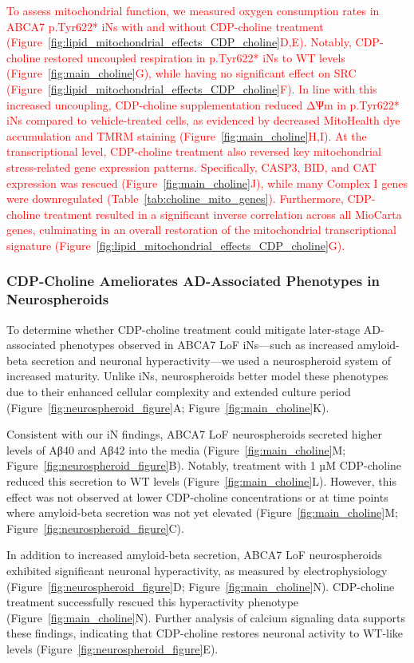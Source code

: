 \textcolor{red}{To assess mitochondrial function, we measured oxygen consumption rates in ABCA7 p.Tyr622* iNs with and without CDP-choline treatment (Figure~\ref{fig:lipid_mitochondrial_effects_CDP_choline}D,E). Notably, CDP-choline restored uncoupled respiration in p.Tyr622* iNs to WT levels (Figure~\ref{fig:main_choline}G), while having no significant effect on SRC (Figure~\ref{fig:lipid_mitochondrial_effects_CDP_choline}F). In line with this increased uncoupling, CDP-choline supplementation reduced ΔѰm in p.Tyr622* iNs compared to vehicle-treated cells, as evidenced by decreased MitoHealth dye accumulation and TMRM staining (Figure~\ref{fig:main_choline}H,I). At the transcriptional level, CDP-choline treatment also reversed key mitochondrial stress-related gene expression patterns. Specifically, CASP3, BID, and CAT expression was rescued (Figure~\ref{fig:main_choline}J), while many Complex I genes were downregulated (Table~\ref{tab:choline_mito_genes}). Furthermore, CDP-choline treatment resulted in a significant inverse correlation across all MioCarta genes, culminating in an overall restoration of the mitochondrial transcriptional signature (Figure~\ref{fig:lipid_mitochondrial_effects_CDP_choline}G).}

\subsubsection{CDP-Choline Ameliorates AD-Associated Phenotypes in Neurospheroids}
To determine whether CDP-choline treatment could mitigate later-stage AD-associated phenotypes observed in ABCA7 LoF iNs—such as increased amyloid-beta secretion and neuronal hyperactivity—we used a neurospheroid system of increased maturity. Unlike iNs, neurospheroids better model these phenotypes due to their enhanced cellular complexity and extended culture period (Figure~\ref{fig:neurospheroid_figure}A; Figure~\ref{fig:main_choline}K).

Consistent with our iN findings, ABCA7 LoF neurospheroids secreted higher levels of Aβ40 and Aβ42 into the media (Figure~\ref{fig:main_choline}M; Figure~\ref{fig:neurospheroid_figure}B). Notably, treatment with 1 µM CDP-choline reduced this secretion to WT levels (Figure~\ref{fig:main_choline}L). However, this effect was not observed at lower CDP-choline concentrations or at time points where amyloid-beta secretion was not yet elevated (Figure~\ref{fig:main_choline}M; Figure~\ref{fig:neurospheroid_figure}C).

In addition to increased amyloid-beta secretion, ABCA7 LoF neurospheroids exhibited significant neuronal hyperactivity, as measured by electrophysiology (Figure~\ref{fig:neurospheroid_figure}D; Figure~\ref{fig:main_choline}N). CDP-choline treatment successfully rescued this hyperactivity phenotype (Figure~\ref{fig:main_choline}N). Further analysis of calcium signaling data supports these findings, indicating that CDP-choline restores neuronal activity to WT-like levels (Figure~\ref{fig:neurospheroid_figure}E).

